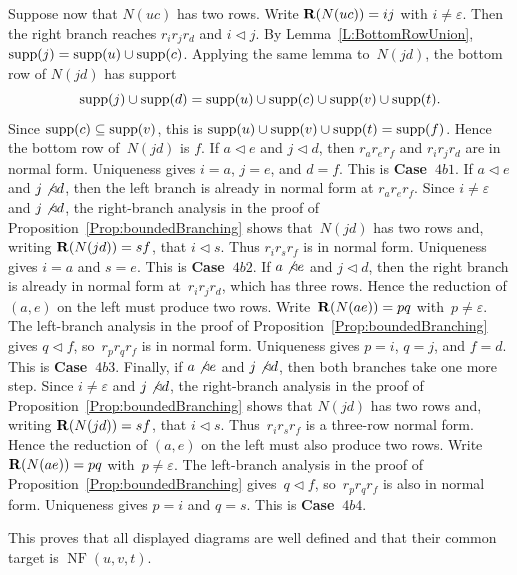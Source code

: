 \documentclass[a4paper, twoside, 11pt, english]{article}
\begin{document}
Suppose now that $N(uc)$ has two rows. Write $\mathbf{R}(N(uc))=ij$ with
$i\neq\varepsilon$. Then the right branch reaches $r_i r_j r_d$ and
$i\triangleleft j$. By Lemma~\ref{L:BottomRowUnion},
$\operatorname{supp}(j)=\operatorname{supp}(u)\cup\operatorname{supp}(c)$. Applying the same lemma to~$N(jd)$, the
bottom row of $N(jd)$ has support
\[
\operatorname{supp}(j)\cup\operatorname{supp}(d)
=
\operatorname{supp}(u)\cup\operatorname{supp}(c)\cup\operatorname{supp}(v)\cup\operatorname{supp}(t).
\]
Since $\operatorname{supp}(c)\subseteq\operatorname{supp}(v)$, this is
$\operatorname{supp}(u)\cup\operatorname{supp}(v)\cup\operatorname{supp}(t)=\operatorname{supp}(f)$. Hence the bottom row of~$N(jd)$ is $f$.
If $a\triangleleft e$ and $j\triangleleft d$, then
$r_a r_e r_f$ and $r_i r_j r_d$ are in normal form. Uniqueness gives
$i=a$, $j=e$, and $d=f$. This is \textbf{Case~$4b1$}.
If $a\triangleleft e$ and $j\not\triangleleft d$, then the left branch is
already in normal form at $r_a r_e r_f$. Since $i\neq\varepsilon$ and
$j\not\triangleleft d$, the right-branch analysis in the proof of
Proposition~\ref{Prop:boundedBranching} shows that~$N(jd)$ has two rows
and, writing $\mathbf{R}(N(jd))=sf$, that $i\triangleleft s$. Thus
$r_i r_s r_f$ is in normal form. Uniqueness gives $i=a$ and $s=e$.
This is \textbf{Case~$4b2$}.
If $a\not\triangleleft e$ and $j\triangleleft d$, then the right branch is
already in normal form at~$r_i r_j r_d$, which has three rows. Hence the
reduction of $(a,e)$ on the left must produce two rows. Write~$\mathbf{R}(N(ae))=pq$ with~$p\neq\varepsilon$. The left-branch analysis in the
proof of Proposition~\ref{Prop:boundedBranching} gives
$q\triangleleft f$, so~$r_p r_q r_f$ is in normal form. Uniqueness gives
$p=i$, $q=j$, and $f=d$. This is \textbf{Case~$4b3$}.
Finally, if $a\not\triangleleft e$ and $j\not\triangleleft d$, then both
branches take one more step. Since $i\neq\varepsilon$ and
$j\not\triangleleft d$, the right-branch analysis in the proof of
Proposition~\ref{Prop:boundedBranching} shows that $N(jd)$ has two rows
and, writing $\mathbf{R}(N(jd))=sf$, that $i\triangleleft s$. Thus~$r_i r_s r_f$ is a three-row normal form. Hence the reduction of
$(a,e)$ on the left must also produce two rows. Write~$\mathbf{R}(N(ae))=pq$ with~$p\neq\varepsilon$. The left-branch analysis in the
proof of Proposition~\ref{Prop:boundedBranching} gives~$q\triangleleft f$, so~$r_p r_q r_f$ is also in normal form.
Uniqueness gives $p=i$ and $q=s$. This is \textbf{Case~$4b4$}.

This proves that all displayed diagrams are well defined and that their common
target is $\operatorname{NF}(u,v,t)$.
\end{document}
